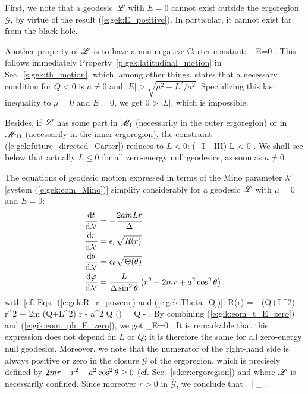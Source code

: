 First, we note that a geodesic $\mathscr{L}$ with $E=0$ cannot exist outside the ergoregion
$\mathscr{G}$, by virtue of the result (\ref{e:gek:E_positive}). In particular,
it cannot exist far from the black hole.

Another property of $\mathscr{L}$ is to have a non-negative Carter constant:
\be \label{e:gik:Q_nonneg_E_zero}
   _{E=0} .
\ee
This follows immediately Property~\ref{p:gek:latitudinal_motion} in Sec.~\ref{s:gek:th_motion},
which, among other things,
states that a necessary condition for $Q < 0$ is $a\neq 0$ and
$|E| > \sqrt{\mu^2 + L^2/a^2}$. Specializing this last inequality to $\mu=0$
and $E=0$, we get $0 > |L|$, which is impossible.

Besides, if $\mathscr{L}$ has some part in $\mathscr{M}_{\rm I}$ (necessarily in the outer ergoregion)
or in $\mathscr{M}_{\rm III}$ (necessarily in the inner ergoregion),
the constraint (\ref{e:gek:future_directed_Carter})
reduces to $L<0$:
\be \label{e:gik:E_zero_L_neg_ergo}
    \Li \cap (\M_{\rm I} \cup \M_{\rm III}) \neq  \varnothing \quad \Longrightarrow \quad L < 0 .
\ee
We shall see below that actually $L \leq 0$ for all zero-energy null geodesics, as soon as $a\neq 0$.

The equations of geodesic motion expressed in terms of the Mino parameter $\lambda'$
[system (\ref{e:gek:eom_Mino})] simplify considerably for a geodesic $\mathscr{L}$ with $\mu=0$ and $E=0$:
\begin{subequations}
\begin{align}
&  \frac{\mathrm{d} t}{\mathrm{d} \lambda'} = - \frac{2 a m L r}{\Delta} \label{e:gik:eom_t_E_zero} \\
&  \frac{\mathrm{d} r}{\mathrm{d} \lambda'} = \epsilon_r \sqrt{ R(r) }  \label{e:gik:eom_r_E_zero}\\
&  \frac{\mathrm{d} \theta}{\mathrm{d} \lambda'} = \epsilon_\theta \sqrt{\Theta(\theta)}  \\
&  \frac{\mathrm{d} \varphi}{\mathrm{d} \lambda'}  = \frac{L}{\Delta\sin^2\theta} \left( r^2 - 2 m r + a^2\cos^2\theta \right) ,
                                \label{e:gik:eom_ph_E_zero}
\end{align}
\end{subequations}
with [cf. Eqs.~(\ref{e:gek:R_r_powers}) and (\ref{e:gek:Theta_Q})]:
\be \label{e:gik:R_E_zero}
    R(r) = - (Q+L^2) r^2 + 2m (Q+L^2) r - a^2 Q
\ee
\be \label{e:gik:Theta_E_zero}
    \Theta(\th) = Q -  .
\ee
By combining (\ref{e:gik:eom_t_E_zero}) and (\ref{e:gik:eom_ph_E_zero}), we get
\be
    _{E=0} .
\ee
It is remarkable that this expression does not depend on $L$ or $Q$; it is therefore the
same for all zero-energy null geodesics. Moreover, we note that the numerator
of the right-hand side is always positive or zero in the closure $\overline{\mathscr{G}}$ of the ergoregion,
which is precisely defined by $2mr - r^2 - a^2\cos^2\theta \geq 0$ (cf. Sec.~\ref{s:ker:ergoregion})
and where $\mathscr{L}$ is necessarily confined. Since moreover $r > 0$ in $\overline{\mathscr{G}}$,
we conclude that
\be
    \left.  \right| _{\Li}  .
\ee


